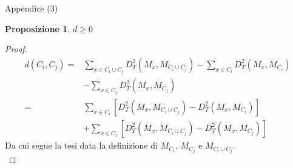 \documentclass[usenames,dvipsnames,9pt]{beamer}
\theoremstyle{definition}
\newtheorem*{prop}{Proposizione}
\begin{document}
\begin{frame}{Appendice (3)}
\begin{prop}
  $d\geq 0$
\end{prop}
\begin{proof}\hfill
\begin{equation*}
\begin{aligned}
d\left(C_{i}, C_{j}\right)=& \sum_{x \in C_{i} \cup C_{j}} D_{T}^{2}\left(M_{x}, M_{C_{i} \cup C_{j}}\right)-\sum_{x \in C_{i}} D_{T}^{2}\left(M_{x}, M_{C_{i}}\right) \\
&-\sum_{x \in C_{j}} D_{T}^{2}\left(M_{x}, M_{C_{j}}\right) \\
=& \sum_{x \in C_{i}} \left[D_{T}^{2}\left(M_{x}, M_{C_{i} \cup C_{j}}\right)- D_{T}^{2}\left(M_{x}, M_{C_{i}}\right)\right] \\
&+\sum_{x \in C_{j}} \left[D_{T}^{2}\left(M_{x}, M_{C_{i} \cup C_{j}}\right)-D_{T}^{2}\left(M_{x}, M_{C_{j}}\right)\right]
\end{aligned}
\end{equation*}
Da cui segue la tesi data la definizione di $M_{C_i}$, $M_{C_j}$ e $M_{C_i\cup C_j}$. \\
\end{proof}
\end{frame}
\end{document}
